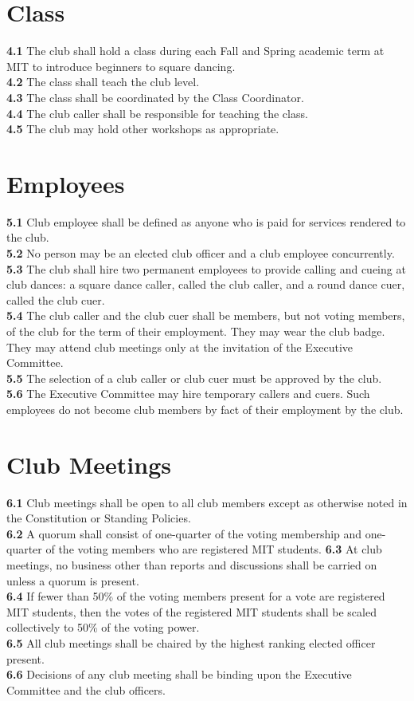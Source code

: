 \documentclass{article}
\begin{document}
\section {Class}
\textbf{4.1} The club shall hold a class during each Fall and Spring academic term at MIT to introduce beginners to square dancing.\\ 
\textbf{4.2} The class shall teach the club level. \\
\textbf{4.3} The class shall be coordinated by the Class Coordinator.\\
\textbf{4.4} The club caller shall be responsible for teaching the class.\\
\textbf{4.5} The club may hold other workshops as appropriate. \\
\section {Employees}
\textbf{5.1} Club employee shall be defined as anyone who is paid for services rendered to the club.\\
\textbf{5.2} No person may be an elected club officer and a club employee concurrently.\\
\textbf{5.3} The club shall hire two permanent employees to provide calling and cueing at club dances: a square dance caller, called the club caller, and a round dance cuer, called the club cuer.\\
\textbf{5.4} The club caller and the club cuer shall be members, but not voting members, of the club for the term of their employment.  They may wear the club badge.  They may attend club meetings only at the invitation of the Executive Committee.\\
\textbf{5.5} The selection of a club caller or club cuer must be approved by the club.\\
\textbf{5.6} The Executive Committee may hire temporary callers and cuers.  Such employees do not become club members by fact of their employment by the club. 
\section {Club Meetings}
\textbf{6.1} Club meetings shall be open to all club members except as otherwise noted in the Constitution or Standing Policies.\\
\textbf{6.2} A quorum shall consist of one-quarter of the voting membership and one-quarter of the voting members who are registered MIT students. 
\textbf{6.3} At club meetings, no business other than reports and discussions shall be carried on unless a quorum is present.\\
\textbf{6.4} If fewer than 50\% of the voting members present for a vote are registered MIT students, then the votes of the registered MIT students shall be scaled collectively to 50\% of the voting power. \\
\textbf{6.5} All club meetings shall be chaired by the highest ranking elected officer present.\\
\textbf{6.6} Decisions of any club meeting shall be binding upon the Executive Committee and the club officers.
\end{document}
